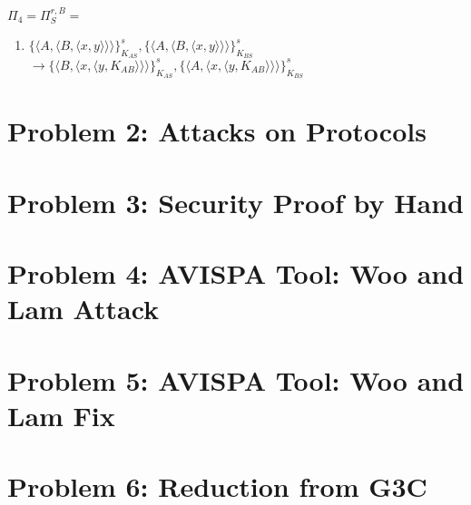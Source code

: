 \documentclass[12pt,pdftex,a4paper]{article}
\newcommand\tab[1][1cm]{\hspace*{#1}}
\begin{document}
$\Pi_4 = \Pi_S^{r,B} =$
\begin{enumerate}
\item \tab $ \{\langle A, \langle B, \langle x, y\rangle\rangle\rangle\}_{K_{AS}}^s, \{\langle A, \langle B, \langle x, y\rangle\rangle\rangle\}_{K_{BS}}^s $ \\ \tab $\rightarrow \{\langle B, \langle x, \langle y, K_{AB}\rangle\rangle\rangle\}_{K_{AS}}^s,\{\langle A, \langle x, \langle y, K_{AB}\rangle\rangle\rangle\}_{K_{BS}}^s $
\end{enumerate}

\section*{Problem 2: Attacks on Protocols}

\section*{Problem 3: Security Proof by Hand}

\section*{Problem 4: AVISPA Tool: Woo and Lam Attack}

\section*{Problem 5: AVISPA Tool: Woo and Lam Fix}

\section*{Problem 6: Reduction from G3C}
\end{document}
